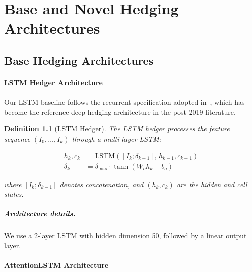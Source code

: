 \documentclass[11pt,oneside]{report}
\newtheorem{definition}{Definition}[chapter]
\begin{document}

\chapter{Base and Novel Hedging Architectures}
\label{sec:architectures}

\section{Base Hedging Architectures}
\label{sec:base}

\subsubsection{LSTM Hedger Architecture}

Our LSTM baseline follows the recurrent specification adopted in~\citet{buehler2019deep}, which has become the reference deep-hedging architecture in the post-2019 literature.

\begin{definition}[LSTM Hedger]
The LSTM hedger processes the feature sequence $(I_0, \dots, I_k)$ through a multi-layer LSTM:

\begin{align}
h_k, c_k &= \mathrm{LSTM}([I_k; \delta_{k-1}],\, h_{k-1}, c_{k-1}) \label{eq:lstm_state} \\
\delta_k &= \delta_{\max} \cdot \tanh(W_o h_k + b_o) \label{eq:lstm_output}
\end{align}

where $[I_k; \delta_{k-1}]$ denotes concatenation, and $(h_k, c_k)$ are the hidden and cell states.
\end{definition}

\paragraph{Architecture details.}
We use a 2-layer LSTM with hidden dimension 50, followed by a linear output layer.

\vspace{0.5em}

\subsubsection{AttentionLSTM Architecture}
\end{document}
